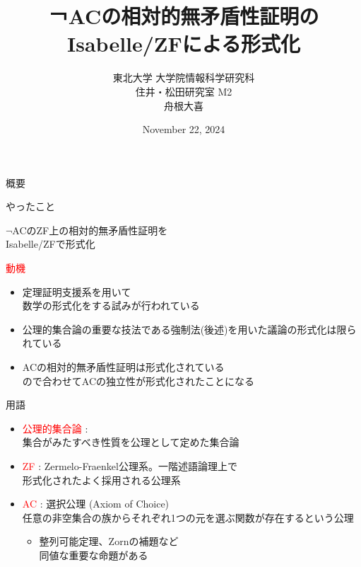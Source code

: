 \documentclass[17pt]{beamer}
\title{￢ACの相対的無矛盾性証明のIsabelle/ZFによる形式化}
\author{東北大学 大学院情報科学研究科\\ 住井・松田研究室 M2\\ 舟根大喜}
\date{November 22, 2024}
\begin{document}
\maketitle

\begin{frame}{概要}
    \vspace{-5pt}
    \begin{itembox}[l]{やったこと}
        \begin{center}
        \vspace{-3pt}
        $\neg$ACのZF上の相対的無矛盾性証明を\\
        Isabelle/ZFで形式化
        \vspace{-3pt}
        \end{center}
    \end{itembox}
    \vspace{-5pt}
    {\small
    \textcolor{red}{動機}
    \begin{itemize}[itemsep=1pt]
    \vspace{-5pt}
        \item 定理証明支援系を用いて\\
        数学の形式化をする試みが行われている
        \item 公理的集合論の重要な技法である強制法(後述)を用いた議論の形式化は限られている
        \item ACの相対的無矛盾性証明は形式化されている\\
        ので合わせてACの独立性が形式化されたことになる
    \end{itemize}}
\end{frame}

\begin{frame}{用語}\,
    \vspace{-20pt}
    {\small 
        \begin{itemize}[itemsep=8pt]
            \item \textcolor{red}{公理的集合論} : \\
            集合がみたすべき性質を公理として定めた集合論
            \item \textcolor{red}{ZF} : 
            Zermelo-Fraenkel公理系。一階述語論理上で\\
            形式化されたよく採用される公理系
            \item \textcolor{red}{AC} : 選択公理 (Axiom of Choice)\\
            任意の非空集合の族からそれぞれ1つの元を選ぶ関数が存在するという公理
            \begin{itemize} 
                \item 整列可能定理、Zornの補題など\\同値な重要な命題がある
            \end{itemize}

        \end{itemize}
    }
\end{frame}
\end{document}
